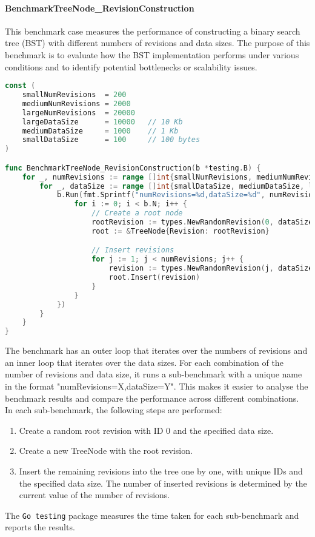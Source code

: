 
\paragraph{BenchmarkTreeNode\_RevisionConstruction}
This benchmark case measures the performance of constructing a binary search tree (BST) with different numbers of revisions and data sizes. The purpose of this benchmark is to evaluate how the BST implementation performs under various conditions and to identify potential bottlenecks or scalability issues.

\begin{lstlisting}[language=go]
const (
	smallNumRevisions  = 200
	mediumNumRevisions = 2000
	largeNumRevisions  = 20000
	largeDataSize      = 10000   // 10 Kb
	mediumDataSize     = 1000    // 1 Kb
	smallDataSize      = 100     // 100 bytes
)

func BenchmarkTreeNode_RevisionConstruction(b *testing.B) {
	for _, numRevisions := range []int{smallNumRevisions, mediumNumRevisions, largeNumRevisions} {
		for _, dataSize := range []int{smallDataSize, mediumDataSize, largeDataSize} {
			b.Run(fmt.Sprintf("numRevisions=%d,dataSize=%d", numRevisions, dataSize), func(b *testing.B) {
				for i := 0; i < b.N; i++ {
					// Create a root node
					rootRevision := types.NewRandomRevision(0, dataSize)
					root := &TreeNode{Revision: rootRevision}

					// Insert revisions
					for j := 1; j < numRevisions; j++ {
						revision := types.NewRandomRevision(j, dataSize)
						root.Insert(revision)
					}
				}
			})
		}
	}
}
\end{lstlisting}

The benchmark has an outer loop that iterates over the numbers of revisions and an inner loop that iterates over the data sizes. For each combination of the number of revisions and data size, it runs a sub-benchmark with a unique name in the format "numRevisions=X,dataSize=Y". This makes it easier to analyse the benchmark results and compare the performance across different combinations.
\\

In each sub-benchmark, the following steps are performed:
\begin{enumerate}
	\item Create a random root revision with ID 0 and the specified data size.
	\item Create a new TreeNode with the root revision.
	\item Insert the remaining revisions into the tree one by one, with unique IDs and the specified data size. The number of inserted revisions is determined by the current value of the number of revisions.
\end{enumerate}
The \lstinline{Go testing} package measures the time taken for each sub-benchmark and reports the results.

